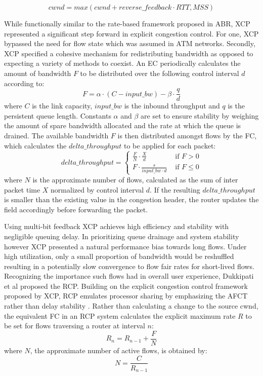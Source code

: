 \begin{equation}
cwnd = max\left (  cwnd + reverse\_feedback \cdot RTT, MSS\right )
\label{eqn:xcpcwnd}
\end{equation}


While functionally similar to the rate-based framework proposed in \ac{ABR}, \ac{XCP} represented a significant step forward in explicit congestion control.
For one, \ac{XCP} bypassed the need for flow state which was assumed in \ac{ATM} networks.
Secondly, \ac{XCP} specified a cohesive mechanism for redistributing bandwidth as opposed to expecting a variety of methods to coexist.
An \ac{EC} periodically calculates the amount of bandwidth $F$ to be distributed over the following control interval $d$ according to:
\begin{equation}
F=\alpha\cdot\left ( C - input\_bw \right ) - \beta\cdot\frac{q}{d}
\label{eqn:ec}
\end{equation}
where $C$ is the link capacity, $input\_bw$ is the inbound throughput and $q$ is the persistent queue length.
Constants $\alpha$ and $\beta$ are set to ensure stability by weighing the amount of spare bandwidth allocated and the rate at which the queue is drained.
The available bandwidth $F$ is then distributed amongst flows by the \ac{FC}, which calculates the $delta\_throughput$ to be applied for each packet:
\begin{equation}
delta\_throughput = \begin{cases}
\frac{F}{N} \cdot \frac{X}{d} & \text{ if } F> 0 \\ 
F \cdot \frac{s}{input\_bw \cdot d} & \text{ if } F\leq 0 
\end{cases}
\end{equation}
where $N$ is the approximate number of flows, calculated as the sum of inter packet time $X$ normalized by control interval $d$.
If the resulting $delta\_throughput$ is smaller than the existing value in the congestion header, the router updates the field accordingly before forwarding the packet.

Using multi-bit feedback \ac{XCP} achieves high efficiency and stability with negligible queuing delay.
In prioritizing queue drainage and system stability however \ac{XCP} presented a natural performance bias towards long flows.
Under high utilization, only a small proportion of bandwidth would be reshuffled resulting in a potentially slow convergence to flow fair rates for short-lived flows.
Recognizing the importance such flows had in overall user experience, Dukkipati et al proposed the \ac{RCP}.
Building on the explicit congestion control framework proposed by \ac{XCP}, \ac{RCP} emulates processor sharing by emphasizing the \ac{AFCT} rather than delay stability \cite{Dukkipati:2005p78}.
Rather than calculating a change to the source \ac{cwnd}, the equivalent \ac{FC} in an \ac{RCP} system calculates the explicit maximum rate $R$ to be set for flows traversing a router at interval $n$:
\begin{equation}
R_n = R_{n-1} + \frac{F}{N}
\end{equation}
where $N$, the approximate number of active flows, is obtained by:
\begin{equation}
N = \frac{C}{R_{n-1}}
\end{equation}

